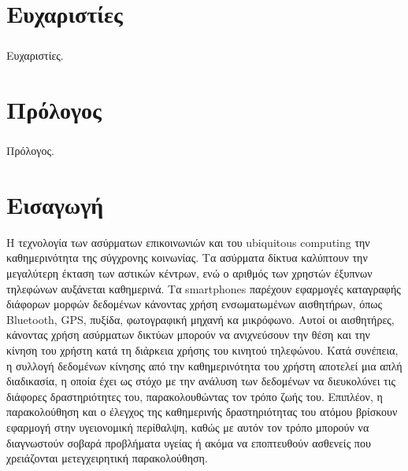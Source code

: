 \documentclass[12pt,twoside,openright]{report}
\begin{document}
\chapter*{Ευχαριστίες}
\thispagestyle{empty}
\normalsize
\onehalfspacing
\paragraph[]{} Ευχαριστίες.
\clearpage\newpage

\pagestyle{fancy}
\begin{doublespacing}
\tableofcontents
\clearpage\newpage
\listoffigures
\clearpage\newpage
\listoftables 
\end{doublespacing}
\clearpage


\chapter*{Πρόλογος}
\paragraph[]{} Πρόλογος.  
\onehalfspacing
\chapter[Εισαγωγή]{Εισαγωγή}
\gt Η τεχνολογία των ασύρματων επικοινωνιών και του \lt ubiquitous computing  την καθημερινότητα της σύγχρονης κοινωνίας. Τα ασύρματα δίκτυα καλύπτουν την μεγαλύτερη έκταση των αστικών κέντρων, ενώ ο αριθμός των χρηστών έξυπνων τηλεφώνων αυξάνεται καθημερινά. Τα \lt smartphones \gt παρέχουν εφαρμογές καταγραφής διάφορων μορφών δεδομένων κάνοντας χρήση ενσωματωμένων αισθητήρων, όπως \lt Bluetooth, GPS, \gt πυξίδα, φωτογραφική μηχανή κα μικρόφωνο. Αυτοί οι αισθητήρες, κάνοντας χρήση ασύρματων δικτύων μπορούν να ανιχνεύσουν την θέση και την κίνηση του χρήστη κατά τη διάρκεια χρήσης του κινητού τηλεφώνου. Κατά συνέπεια, η συλλογή δεδομένων κίνησης από την καθημερινότητα του χρήστη αποτελεί μια απλή διαδικασία, η οποία έχει ως στόχο με την ανάλυση των δεδομένων να διευκολύνει τις διάφορες δραστηριότητες του, παρακολουθώντας τον τρόπο ζωής του. Επιπλέον, η παρακολούθηση και ο έλεγχος της καθημερινής δραστηριότητας του ατόμου βρίσκουν εφαρμογή στην υγειονομική περίθαλψη, καθώς με αυτόν τον τρόπο μπορούν να διαγνωστούν σοβαρά προβλήματα υγείας ή ακόμα να εποπτευθούν ασθενείς που χρειάζονται μετεγχειρητική παρακολούθηση.
\end{document}
